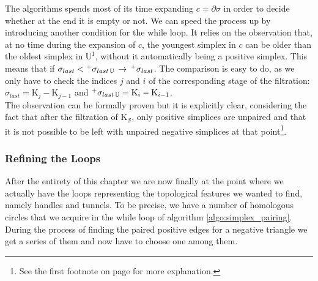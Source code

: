 The algorithms spends most of its time expanding $c = \partial \sigma$ in order to decide whether at the end it is empty or not.
We can speed the process up by introducing another condition for the \textsf{while} loop.
It relies on the observation that, at no time during the expansion of $c$, the youngest simplex in $c$ can be older than the oldest simplex in $\mathbb{U}^{1}$, without it automatically being a positive simplex.
This means that if $\sigma_{last} < \Prefix^{+}{\sigma_{last\,\mathbb{U}}} \,\rightarrow \, \Prefix^{+}{\sigma_{last}}$.
The comparison is easy to do, as we only have to check the indices $j$ and $i$ of the corresponding stage of the filtration: $\sigma_{last} = \mathrm{K}_{j} - \mathrm{K}_{j-1}$ and $\Prefix^{+}{\sigma_{last\,\mathbb{U}}} = \mathrm{K}_{i} - \mathrm{K}_{i-1}$.\\
The observation can be formally proven but it is explicitly clear, considering the fact that after the filtration of $\mathrm{K}_{\mathcal{S}}$, only positive simplices are unpaired and that it is not possible to be left with unpaired negative simplices at that point\footnote{ See the first footnote on page \pageref{fn:simplex_relation} for more explanation.}.

\subsubsection{Refining the Loops}
\label{math_algorithm_looprefinement}

After the entirety of this chapter we are now finally at the point where we actually have the loops representing the topological features we wanted to find, namely handles and tunnels.
To be precise, we have a number of homologous circles that we acquire in the \textsf{while} loop of algorithm \ref{algo:simplex_pairing}.
During the process of finding the paired positive edges for a negative triangle we get a series of them and now have to choose one among them.

